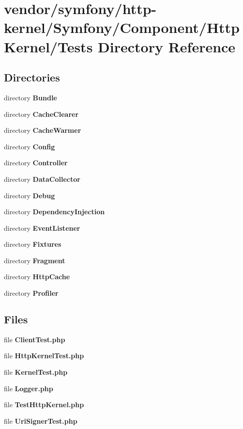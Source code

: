 \section{vendor/symfony/http-\/kernel/\+Symfony/\+Component/\+Http\+Kernel/\+Tests Directory Reference}
\label{dir_b79eb134908cb5fbec5d661fea11fdba}
\subsection*{Directories}
\begin{DoxyCompactItemize}
\item 
directory {\bf Bundle}
\item 
directory {\bf Cache\+Clearer}
\item 
directory {\bf Cache\+Warmer}
\item 
directory {\bf Config}
\item 
directory {\bf Controller}
\item 
directory {\bf Data\+Collector}
\item 
directory {\bf Debug}
\item 
directory {\bf Dependency\+Injection}
\item 
directory {\bf Event\+Listener}
\item 
directory {\bf Fixtures}
\item 
directory {\bf Fragment}
\item 
directory {\bf Http\+Cache}
\item 
directory {\bf Profiler}
\end{DoxyCompactItemize}
\subsection*{Files}
\begin{DoxyCompactItemize}
\item 
file {\bf Client\+Test.\+php}
\item 
file {\bf Http\+Kernel\+Test.\+php}
\item 
file {\bf Kernel\+Test.\+php}
\item 
file {\bf Logger.\+php}
\item 
file {\bf Test\+Http\+Kernel.\+php}
\item 
file {\bf Uri\+Signer\+Test.\+php}
\end{DoxyCompactItemize}
